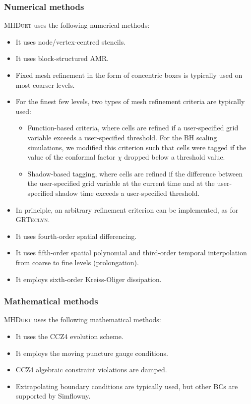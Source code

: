 \documentclass[12pt,a4paper]{article}
\numberwithin{figure}{subsection}
\newcommand{\grteclyn}{\textsc{GRTeclyn}\xspace}
\newcommand{\mhduet}{\textsc{MHDuet}\xspace}
\begin{document}
\subsubsection{Numerical methods}
\mhduet uses the following numerical methods:
\begin{itemize}
    \item It uses node/vertex-centred stencils.
    \item It uses block-structured AMR.
    \item Fixed mesh refinement in the form of concentric boxes is typically
    used on most coarser levels.
    \item For the finest few levels, two types of mesh refinement criteria are
    typically used:
    \begin{itemize}
        \item Function-based criteria, where cells are refined if a
        user-specified grid variable exceeds a user-specified threshold. For the
        BH scaling simulations, we modified this criterion such that cells were
        tagged if the value of the conformal factor $\chi$ dropped below a
        threshold value.
        \item Shadow-based tagging, where cells are refined if the difference
        between the user-specified grid variable at the current time and at the
        user-specified shadow time exceeds a user-specified threshold.
    \end{itemize}
    \item In principle, an arbitrary refinement criterion can be implemented, as
    for \grteclyn.
    \item It uses fourth-order spatial differencing.
    \item It uses fifth-order spatial polynomial and third-order temporal
    interpolation from coarse to fine levels (prolongation).
    \item It employs sixth-order Kreiss-Oliger dissipation.
\end{itemize}

\subsubsection{Mathematical methods}
\mhduet uses the following mathematical methods:
\begin{itemize}
    \item It uses the CCZ4 evolution scheme.
    \item It employs the moving puncture gauge conditions.
    \item CCZ4 algebraic constraint violations are damped.
    \item Extrapolating boundary conditions are typically used, but other BCs
    are supported by Simflowny.
\end{itemize}
\end{document}
